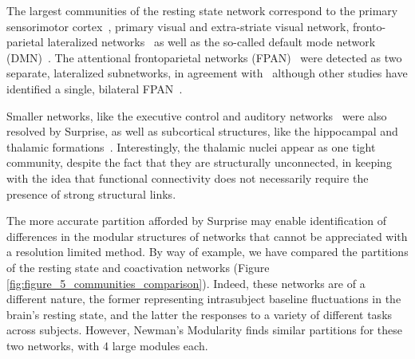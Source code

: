 

The largest communities of the resting state network correspond to the primary sensorimotor cortex~\cite{biswal1995}, primary visual and extra-striate visual network, fronto-parietal lateralized networks~\cite{smith2009} as well as the so-called default mode network (DMN)~\cite{raichle2001,fransson2006}.
The attentional frontoparietal networks (FPAN)~\cite{beckmann2005} were detected as two separate, lateralized subnetworks, in agreement with~\cite{deluca2006} although other studies have identified a single, bilateral FPAN~\cite{markett2014}.

Smaller networks, like the executive control and auditory networks~\cite{salvador2005,vandenheuvel2010} were also resolved by Surprise, as well as subcortical structures, like the hippocampal and thalamic formations~\cite{roy2009,chen2013}. Interestingly, the thalamic nuclei appear as one tight community, despite the fact that they are structurally unconnected, in keeping with the idea that functional connectivity does not necessarily require the presence of strong structural links.

The more accurate partition afforded by Surprise may enable identification of differences in the modular structures of networks that cannot be appreciated with a resolution limited method. By way of example, we have compared the partitions of the resting state and coactivation networks (Figure \ref{fig:figure_5_communities_comparison}). Indeed, these networks are of a different nature, the former representing intrasubject baseline fluctuations in the brain's resting state, and the latter the responses to a variety of different tasks across subjects. However, Newman's Modularity finds similar partitions for these two networks, with 4 large modules each.

